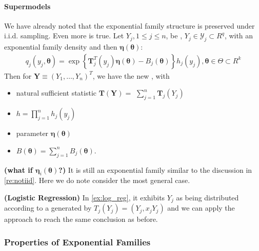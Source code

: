 \documentclass{article}
\newcommand{\bfs}[1]{\textbf{({#1}) }}
\begin{document}
\paragraph{Supermodels}\label{sec:sup}
We have already noted that the exponential family structure is preserved under i.i.d. sampling. Even more is true. Let $Y_{j}, 1 \leq j \leq n$, be , $Y_{j} \in \mathcal{Y}_{j} \subset R^{q}$, with an exponential family density and then  $\boldsymbol{\eta}(\boldsymbol{\theta})$:
\begin{align*}
q_{j}\left(y_{j}, \boldsymbol{\theta}\right)=\exp \left\{\mathbf{T}_{j}^{T}\left(y_{j}\right) \boldsymbol{\eta}(\boldsymbol{\theta})-B_{j}(\boldsymbol{\theta})\right\} h_{j}\left(y_{j}\right), \boldsymbol{\theta} \in \Theta \subset R^{k}
\end{align*}
Then for $\mathbf{Y} \equiv\left(Y_{1}, \ldots, Y_{n}\right)^{T}$, we have the new , with
\begin{itemize}
    \item  natural sufficient statistic $\mathbf{T}(\mathbf{Y})=$ $\sum_{j=1}^{n} \mathbf{T}_{j}\left(Y_{j}\right)$ 
    \item $h=\prod_{j=1}^{n} h_{j}\left(y_{j}\right)$
    \item  parameter $\boldsymbol{\eta}(\boldsymbol{\theta})$
    \item $B(\boldsymbol{\theta})=\sum_{j=1}^{n} B_{j}(\boldsymbol{\theta}) .$
\end{itemize}
\begin{rema}\bfs{what if  $\boldsymbol{\eta}_i(\boldsymbol{\theta})$?}
It is still an  exponential family similar to the discussion in \cref{re:notiid}. Here we do note consider the most general case.
\end{rema}

\begin{exma}\bfs{Logistic Regression}
 In \cref{ex:log_reg}, it exhibits $Y_{j}$ as being distributed according to a  generated by $T_{j}\left(Y_{j}\right)=\left(Y_{j}, x_{j} Y_{j}\right)$ and we can apply the  approach to reach the same conclusion as before.
\end{exma}
\subsubsection{Properties of Exponential Families}
\end{document}
